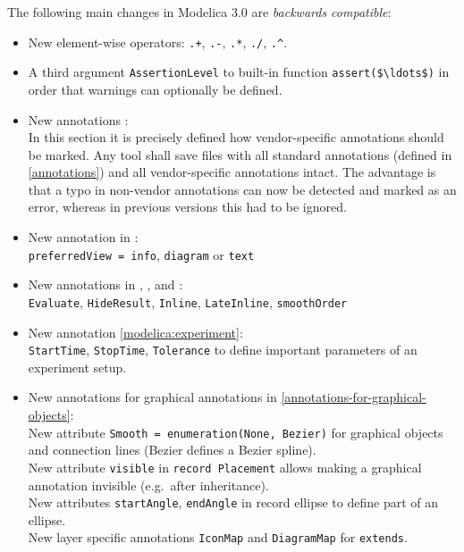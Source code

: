 The following main changes in Modelica 3.0 are \emph{backwards compatible}:
\begin{itemize}
\item
  New element-wise operators: \lstinline!.+!, \lstinline!.-!, \lstinline!.*!, \lstinline!./!, \lstinline!.^!.
\item
  A third argument \lstinline!AssertionLevel! to built-in function \lstinline!assert($\ldots$)! in order that warnings can optionally be defined.
\item
  New annotations :\\
  In this section it is precisely defined how vendor-specific
  annotations should be marked. Any tool shall save files with all
  standard annotations (defined in \cref{annotations}) and all vendor-specific
  annotations intact. The advantage is that a typo in non-vendor
  annotations can now be detected and marked as an error, whereas in
  previous versions this had to be ignored.
\item
  New annotation in :\\
  \lstinline!preferredView = info!, \lstinline!diagram! or \lstinline!text!
\item
  New annotations in , , and :\\
  \lstinline!Evaluate!, \lstinline!HideResult!, \lstinline!Inline!, \lstinline!LateInline!, \lstinline!smoothOrder!
\item
  New annotation \cref{modelica:experiment}:\\
  \lstinline!StartTime!, \lstinline!StopTime!, \lstinline!Tolerance! to define important parameters of an experiment setup.
\item
  New annotations for graphical annotations in \cref{annotations-for-graphical-objects}:\\
  New attribute \lstinline!Smooth = enumeration(None, Bezier)! for graphical objects
  and connection lines (Bezier defines a Bezier spline).\\
  New attribute \lstinline!visible! in \lstinline!record Placement! allows making a graphical
  annotation invisible (e.g.\ after inheritance).\\
  New attributes \lstinline!startAngle!, \lstinline!endAngle! in record ellipse to define part
  of an ellipse.\\
  New layer specific annotations \lstinline!IconMap! and \lstinline!DiagramMap! for \lstinline!extends!.\\

\end{itemize}
